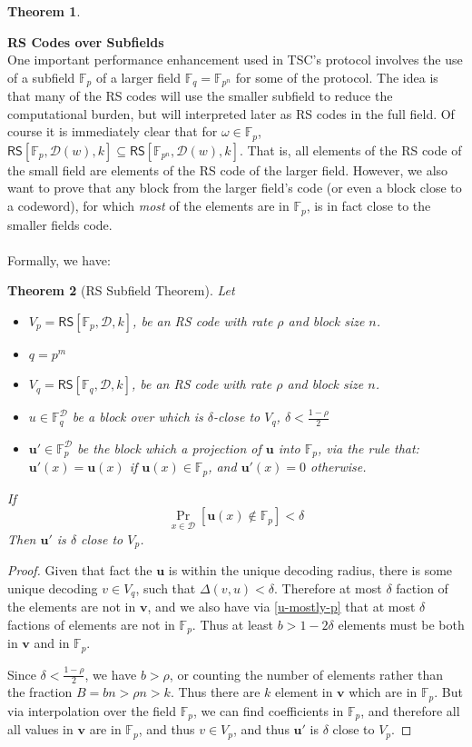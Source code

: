 \documentclass[10pt,letterpaper,titlepage]{article}
\newcommand{\GF}[1]{\mathbb{F}_{#1}}
\newcommand{\w}[0]{\omega}
\newcommand{\p}[0]{\rho}
\newcommand{\dd}[0]{\delta}
\newcommand{\D}[0]{\mathcal{D}}
\newtheorem{theorem}{Theorem}
\theoremstyle{definition}
\begin{document}
\begin{appendices}
\begin{theorem}
\end{theorem}
\noindent
\textbf{RS Codes over Subfields}\\
One important performance enhancement used in TSC's protocol involves the use of a subfield $\GF{p}$ of a larger field $\GF{q}=\GF{p^n}$ for some of the protocol.
The idea is that many of the RS codes will use the smaller subfield to reduce the computational burden, but will interpreted later as RS codes in the full field.
Of course it is immediately clear that for $\w \in \GF{p}$, $\mathsf{RS}[\GF{p}, \D(w), k] \subseteq \mathsf{RS}[\GF{p^n}, \D(w), k]$.
That is, all elements of the RS code of the small field are elements of the RS code of the larger field.
However, we also want to prove that any block from the larger field's code (or even a block close to a codeword), for which \emph{most} of the elements are in $\GF{p}$, is in fact close to the smaller fields code.\\
\\
Formally, we have:
\begin{theorem}[RS Subfield Theorem]
  Let
  \begin{itemize}
    \item $V_p = \mathsf{RS}[\GF{p}, \D, k]$, be an RS code with rate $\p$ and block size $n$.
    \item $q = p^m$
    \item $V_q = \mathsf{RS}[\GF{q}, \D, k]$, be an RS code with rate $\p$ and block size $n$.
    \item $u \in \GF{q}^\D$ be a block over which is $\dd$-close to $V_q$, $\dd < \frac{1 - \p}{2}$
    \item $\mathbf{u'} \in \GF{p}^\D$ be the block which a projection of $\mathbf{u}$ into $\GF{p}$, via the rule that:
          $\mathbf{u'}(x) = \mathbf{u}(x)$ if $\mathbf{u}(x) \in \GF{p}$, and $\mathbf{u'}(x) = 0$ otherwise.
  \end{itemize}
  If \begin{equation}
    \label{u-mostly-p}
    \Pr_{x \in \D}[\mathbf{u}(x) \notin \GF{p}] < \dd
  \end{equation}
  Then $\mathbf{u'}$ is $\dd$ close to $V_p$.
\end{theorem}
\begin{proof}
  Given that fact the $\mathbf{u}$ is within the unique decoding radius, there is some unique decoding $v \in V_q$, such that $\Delta(v, u) < \dd$.
  Therefore at most $\dd$ faction of the elements are not in $\mathbf{v}$, and we also have via \ref{u-mostly-p} that at most $\dd$ factions of elements are not in $\GF{p}$.
  Thus at least $b > 1 - 2 \dd$ elements must be both in $\mathbf{v}$ and in $\GF{p}$.

  Since $\dd < \frac{1 - \p}{2}$, we have $b > \p$, or counting the number of elements rather than the fraction $B = b n > \p n > k$.  
  Thus there are $k$ element in $\mathbf{v}$ which are in $\GF{p}$.  
  But via interpolation over the field $\GF{p}$, we can find coefficients in $\GF{p}$, and therefore all all values in $\mathbf{v}$ are in $\GF{p}$, and thus $v \in V_p$, and thus $\mathbf{u'}$ is $\dd$ close to $V_p$.
\end{proof}
\end{appendices}
\end{document}
